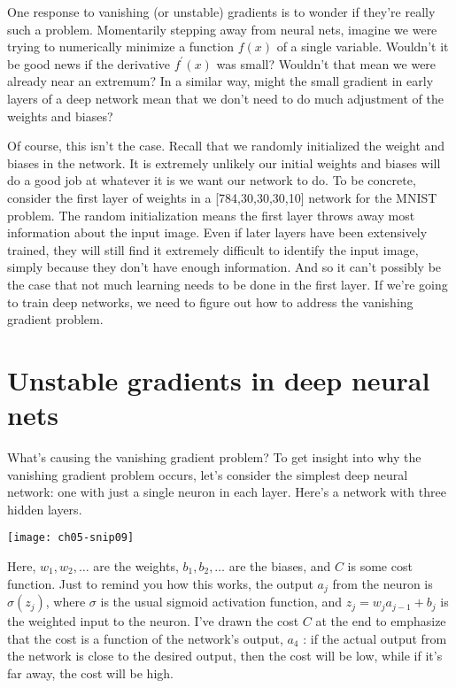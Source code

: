 One response to vanishing (or unstable) gradients is to wonder if they're really such a problem. Momentarily stepping away from neural nets, imagine we were trying to numerically minimize a function $f(x)$ of a single variable. Wouldn't it be good news if the derivative $f^\prime(x)$ was small? Wouldn't that mean we were already near an extremum? In a similar way, might the small gradient in early layers of a deep network mean that we don't need to do much adjustment of the weights and biases?

Of course, this isn't the case. Recall that we randomly initialized the weight and biases in the network. It is extremely unlikely our initial weights and biases will do a good job at whatever it is we want our network to do. To be concrete, consider the first layer of weights in a [784,30,30,30,10]
network for the MNIST problem. The random initialization means the first layer throws away most information about the input image. Even if later layers have been extensively trained, they will still find it extremely difficult to identify the input image, simply because they don't have enough information. And so it can't possibly be the case that not much learning needs to be done in the first layer. If we're going to train deep networks, we need to figure out how to address the vanishing gradient problem.


\section{Unstable gradients in deep neural nets}

What's causing the vanishing gradient problem? 
To get insight into why the vanishing gradient problem occurs, let's consider the simplest deep neural network: one with just a single neuron in each layer. Here's a network with three hidden layers.
\begin{marginfigure}
    \texttt{[image: ch05-snip09]}
    \end{marginfigure}
  
Here, $w_1,w_2,\ldots$ are the weights,  $b_1,b_2,\ldots$ are the biases, and $C$ is some cost function. Just to remind you how this works, the output $a_j$ from the  neuron is $\sigma\left(z_{j}\right)$, where $\sigma$ is the usual sigmoid activation function, and $z_{j}=w_{j} a_{j-1}+b_{j}$ is the weighted input to the neuron. I've drawn the cost $C$ at the end to emphasize that the cost is a function of the network's output, $a_4$ : if the actual output from the network is close to the desired output, then the cost will be low, while if it's far away, the cost will be high.

